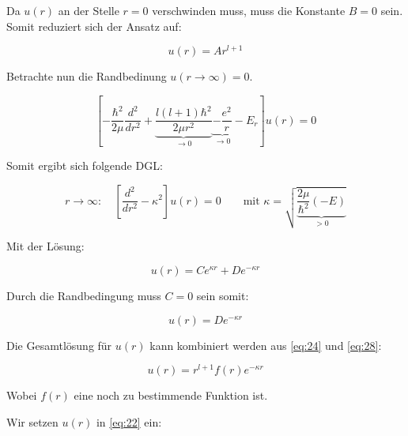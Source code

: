 Da \(u(r)\) an der Stelle \(r=0\) verschwinden muss, muss die Konstante \(B=0\) sein. Somit reduziert sich der Ansatz auf:

\begin{equation}
  \label{eq:24}
  u(r) = Ar^{l+1}
\end{equation}

Betrachte nun die Randbedinung \(u(r\to \infty) = 0\).

\begin{equation}
  \label{eq:25}
  \left[-\frac{\hbar^2}{2\mu}\frac{d^2}{dr^2} + \underbrace{\frac{l(l+1)\hbar^2}{2\mu r^2}}_{\to 0}  \underbrace{- \frac{e^2}{r} }_{\to 0} - E_r  \right] u(r)   = 0 
\end{equation}

Somit ergibt sich folgende DGL:

\begin{equation}
  \label{eq:26}
  r\to \infty: \quad\left[\frac{d^2}{dr^2} - \kappa^2\right]u(r) = 0 \qquad \text{mit }\kappa = \sqrt{\underbrace{\frac{2\mu}{\hbar^2}(-E)}_{>0}}
\end{equation}

Mit der Lösung:

\begin{equation}
  \label{eq:27}
  u(r) = Ce^{\kappa r}+De^{-\kappa r}
\end{equation}

Durch die Randbedingung muss \(C=0\) sein somit:

\begin{equation}
  \label{eq:28}
    u(r) = De^{-\kappa r}
\end{equation}

Die Gesamtlösung für \(u(r)\) kann kombiniert werden aus \eqref{eq:24} und \eqref{eq:28}:

\begin{equation}
  \label{eq:29}
  u(r) = r^{l+1}f(r)e^{-\kappa r}
\end{equation}

Wobei \(f(r)\) eine noch zu bestimmende Funktion ist.  

Wir setzen \(u(r)\) in \eqref{eq:22} ein:

